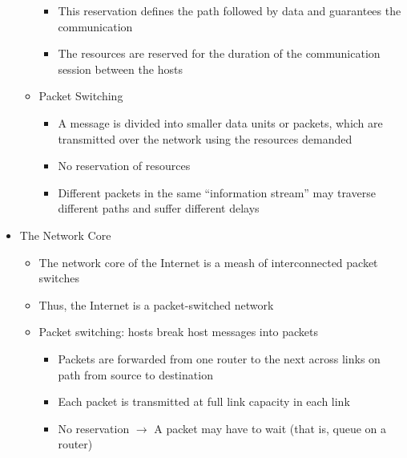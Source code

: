 \begin{itemize}
\begin{itemize}
\begin{itemize}
          \item This reservation defines the path followed by data and guarantees the communication

          \item The resources are reserved for the duration of the communication session between the hosts

        \end{itemize}

      \item Packet Switching

        \begin{itemize}

          \item A message is divided into smaller data units or packets, which are transmitted over the network using the resources demanded

          \item No reservation of resources

          \item Different packets in the same ``information stream'' may traverse different paths and suffer different delays

        \end{itemize}

    \end{itemize}

  \item The Network Core

    \begin{itemize}

      \item The network core of the Internet is a meash of interconnected packet switches

      \item Thus, the Internet is a packet-switched network

      \item Packet switching: hosts break host messages into packets

        \begin{itemize}

          \item Packets are forwarded from one router to the next across links on path from source to destination

          \item Each packet is transmitted at full link capacity in each link

          \item No reservation $\rightarrow$ A packet may have to wait (that is, queue on a router)


\end{itemize}
\end{itemize}
\end{itemize}
